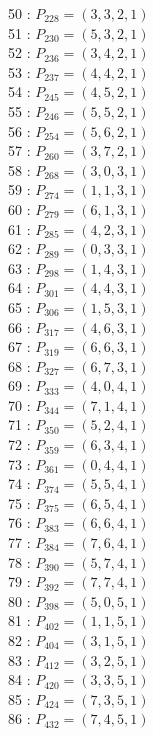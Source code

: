 \documentclass{article}
\begin{document}
{\begin{multicols}{3}
50 : $P_{228}=( 3, 3, 2, 1 )$\\
51 : $P_{230}=( 5, 3, 2, 1 )$\\
52 : $P_{236}=( 3, 4, 2, 1 )$\\
53 : $P_{237}=( 4, 4, 2, 1 )$\\
54 : $P_{245}=( 4, 5, 2, 1 )$\\
55 : $P_{246}=( 5, 5, 2, 1 )$\\
56 : $P_{254}=( 5, 6, 2, 1 )$\\
57 : $P_{260}=( 3, 7, 2, 1 )$\\
58 : $P_{268}=( 3, 0, 3, 1 )$\\
59 : $P_{274}=( 1, 1, 3, 1 )$\\
60 : $P_{279}=( 6, 1, 3, 1 )$\\
61 : $P_{285}=( 4, 2, 3, 1 )$\\
62 : $P_{289}=( 0, 3, 3, 1 )$\\
63 : $P_{298}=( 1, 4, 3, 1 )$\\
64 : $P_{301}=( 4, 4, 3, 1 )$\\
65 : $P_{306}=( 1, 5, 3, 1 )$\\
66 : $P_{317}=( 4, 6, 3, 1 )$\\
67 : $P_{319}=( 6, 6, 3, 1 )$\\
68 : $P_{327}=( 6, 7, 3, 1 )$\\
69 : $P_{333}=( 4, 0, 4, 1 )$\\
70 : $P_{344}=( 7, 1, 4, 1 )$\\
71 : $P_{350}=( 5, 2, 4, 1 )$\\
72 : $P_{359}=( 6, 3, 4, 1 )$\\
73 : $P_{361}=( 0, 4, 4, 1 )$\\
74 : $P_{374}=( 5, 5, 4, 1 )$\\
75 : $P_{375}=( 6, 5, 4, 1 )$\\
76 : $P_{383}=( 6, 6, 4, 1 )$\\
77 : $P_{384}=( 7, 6, 4, 1 )$\\
78 : $P_{390}=( 5, 7, 4, 1 )$\\
79 : $P_{392}=( 7, 7, 4, 1 )$\\
80 : $P_{398}=( 5, 0, 5, 1 )$\\
81 : $P_{402}=( 1, 1, 5, 1 )$\\
82 : $P_{404}=( 3, 1, 5, 1 )$\\
83 : $P_{412}=( 3, 2, 5, 1 )$\\
84 : $P_{420}=( 3, 3, 5, 1 )$\\
85 : $P_{424}=( 7, 3, 5, 1 )$\\
86 : $P_{432}=( 7, 4, 5, 1 )$\\

\end{multicols}}
\end{document}
